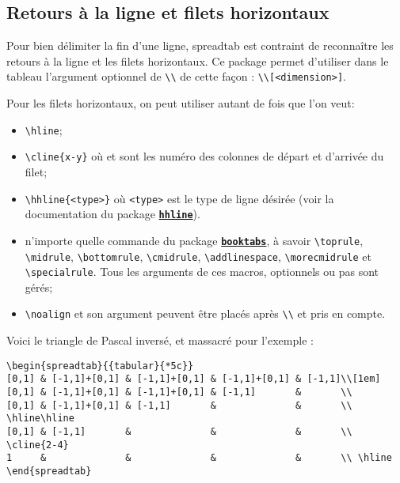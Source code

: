 \documentclass[a4paper,10pt]{article}
\newcommand\verbinline[1][]{\lstinline[breaklines=false,basicstyle=\normalsize\ttfamily,#1]}
\newcommand\ST{\textsf{spreadtab}\xspace}
\newcommand\falseverb[1]{\texttt{\detokenize{#1}}}
\begin{document}
\subsection{Retours à la ligne et filets horizontaux}
Pour bien délimiter la fin d'une ligne, \ST est contraint de reconnaître les retours à la ligne et les filets horizontaux. Ce package permet d'utiliser dans le tableau l'argument optionnel de \verb-\\- de cette façon : \verb-\\[<dimension>]-.

Pour les filets horizontaux, on peut utiliser autant de fois que l'on veut:
\begin{itemize}
	\item \verb-\hline-;
	\item \verb=\cline{x-y}= où \falseverb x et \falseverb y sont les numéro des colonnes de départ et d'arrivée du filet;
	\item \verb=\hhline{<type>}= où \verb=<type>= est le type de ligne désirée (voir la documentation du package \href{http://www.ctan.org/tex-archive/macros/latex/required/tools/}{\texttt{\textbf{hhline}}}).
	\item n'importe quelle commande du package \href{http://www.ctan.org/tex-archive/macros/latex/contrib/booktabs/}{\texttt{\textbf{booktabs}}}, à savoir \verb-\toprule-, \verb-\midrule-, \verb-\bottomrule-, \verb-\cmidrule-, \verb-\addlinespace-, \verb-\morecmidrule- et \verb-\specialrule-. Tous les arguments de ces macros, optionnels ou pas sont gérés;
	\item \verbinline-\noalign- et son argument peuvent être placés après \verb-\\- et pris en compte.
\end{itemize}
Voici le triangle de Pascal inversé, et massacré pour l'exemple :\par\nobreak
\begin{lstlisting}
\begin{spreadtab}{{tabular}{*5c}}
[0,1] & [-1,1]+[0,1] & [-1,1]+[0,1] & [-1,1]+[0,1] & [-1,1]\\[1em]
[0,1] & [-1,1]+[0,1] & [-1,1]+[0,1] & [-1,1]       &       \\
[0,1] & [-1,1]+[0,1] & [-1,1]       &              &       \\ \hline\hline
[0,1] & [-1,1]       &              &              &       \\ \cline{2-4}
1     &              &              &              &       \\ \hline
\end{spreadtab}
\end{lstlisting}
\end{document}
